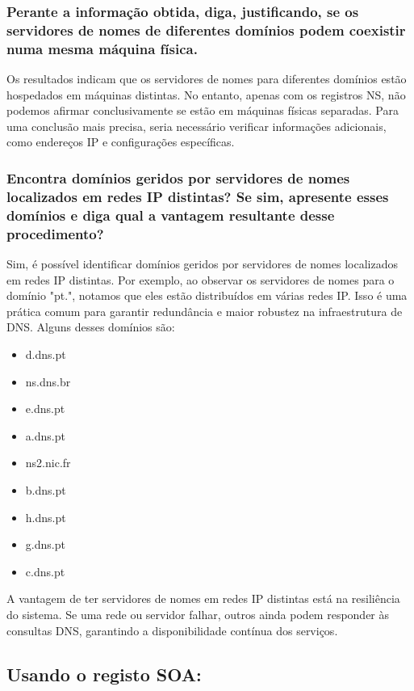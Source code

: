 \subsubsection{Perante a informação obtida, diga, justificando, se os servidores de nomes de diferentes domínios
podem coexistir numa mesma máquina física.}

Os resultados indicam que os servidores de nomes para diferentes 
domínios estão hospedados em máquinas distintas. No entanto, apenas 
com os registros NS, não podemos afirmar conclusivamente se estão em 
máquinas físicas separadas. Para uma conclusão mais precisa, seria 
necessário verificar informações adicionais, como endereços IP e 
configurações específicas.


\subsubsection{Encontra domínios geridos por servidores de nomes localizados em redes IP distintas? Se sim,
apresente esses domínios e diga qual a vantagem resultante desse procedimento?}

Sim, é possível identificar domínios geridos por servidores de nomes 
localizados em redes IP distintas. Por exemplo, ao observar os 
servidores de nomes para o domínio "pt.", notamos que eles estão 
distribuídos em várias redes IP. Isso é uma prática comum para 
garantir redundância e maior robustez na infraestrutura de DNS. 
Alguns desses domínios são:

\begin{itemize}
    \item d.dns.pt
    \item ns.dns.br
    \item e.dns.pt
    \item a.dns.pt
    \item ns2.nic.fr
    \item b.dns.pt
    \item h.dns.pt
    \item g.dns.pt
    \item c.dns.pt
\end{itemize}

A vantagem de ter servidores de nomes em redes IP distintas está na 
resiliência do sistema. Se uma rede ou servidor falhar, outros ainda 
podem responder às consultas DNS, garantindo a disponibilidade 
contínua dos serviços.


\subsection{Usando o registo SOA:}

